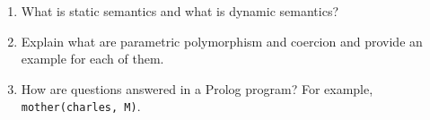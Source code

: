 \begin{enumerate}
\newpage
\item What is static semantics and what is dynamic semantics?
\vspace{6cm}


\item Explain what are parametric polymorphism and coercion and provide an example for each of them.
\vspace{6cm}

\item How are questions answered in a Prolog program? For example, \texttt{mother(charles, M)}.
\end{enumerate}